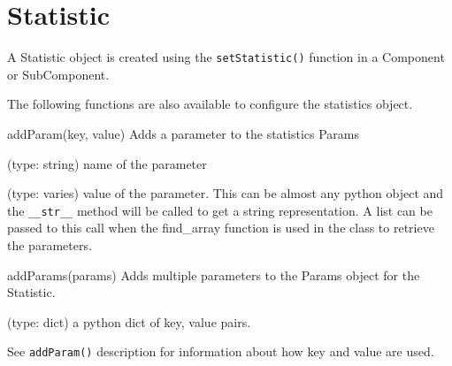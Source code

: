 \section{Statistic}

A Statistic object is created using the \lstinline{setStatistic()}
function in a Component or SubComponent.

The following functions are also available to configure the statistics
object.

\begin{functiondoc}{addParam(key, value)}
  {  Adds a parameter to the statistics Params }

   (type: string) name of the parameter

   (type: varies) value of the parameter.  This can be
  almost any python object and the \lstinline{__str__} method will be
  called to get a string representation.  A list can be passed to this
  call when the find\_array function is used in the class to retrieve
  the parameters.

  \noreturn
\end{functiondoc}

\begin{functiondoc}{addParams(params)}
  { Adds multiple parameters to the Params object for the Statistic.}

   (type: dict) a python dict of key, value pairs.

  See \lstinline{addParam()} description for information about how key
  and value are used.

  \noreturn
\end{functiondoc}






